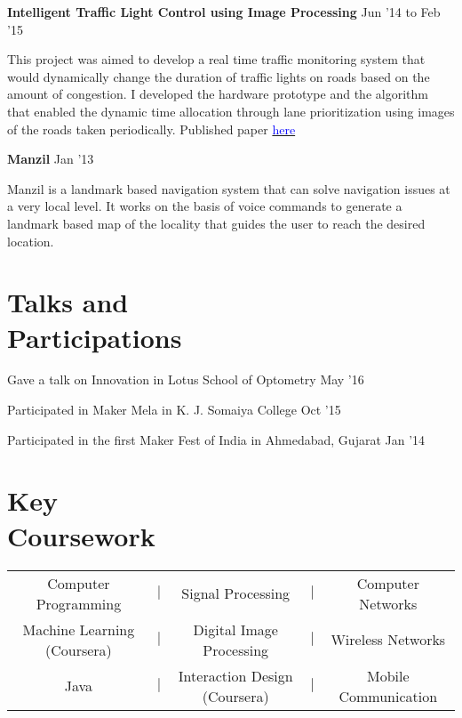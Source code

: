 \documentclass[margin,line]{res}
\newenvironment{list1}{
  \begin{list}{\ding{113}}{%
      \setlength{\itemsep}{0in}
      \setlength{\parsep}{0in} \setlength{\parskip}{0in}
      \setlength{\topsep}{0in} \setlength{\partopsep}{0in} 
      \setlength{\leftmargin}{0.17in}}}{\end{list}}
\begin{document}
\begin{resume}
\vspace*{-0.1in}

{\bf Intelligent Traffic Light Control using Image Processing} \hfill {Jun '14 to Feb '15} \\
\vspace*{-.15in}
\begin{list1}
\item[]This project was aimed to develop a real time traffic monitoring system that would dynamically change the duration of traffic lights on roads based on the amount of congestion. I developed the hardware prototype and the algorithm that enabled the dynamic time allocation through lane prioritization using images of the roads taken periodically.   
Published paper \href{http://iraj.in/up_proc/pdf/129-14265951081-3.pdf}{\textcolor{blue}{here}}
\end{list1}

\vspace*{-0.1in}

{\bf Manzil} \hfill {Jan '13} \\
\vspace*{-.15in}
\begin{list1}
\item[]
Manzil is a landmark based navigation system that can solve navigation issues at a very local level. It works on the basis of voice commands to generate a landmark based map of the locality that guides the user to reach the desired location. 
\end{list1}

\section{\sc Talks and \\ Participations}
{Gave a talk on Innovation in Lotus School of Optometry} \hfill {May '16}

\vspace*{-0.1in}

{Participated in Maker Mela in K. J. Somaiya College} \hfill {Oct '15}

\vspace*{-0.1in}

{Participated in the first Maker Fest of India in Ahmedabad, Gujarat} \hfill {Jan '14} 

\section{\sc Key \\Coursework} 
\begin{tabular}{ccccc}
Computer Programming & $|$ & Signal Processing & $|$ & Computer Networks \\
Machine Learning (Coursera) & $|$ & Digital Image Processing & $|$ & Wireless Networks \\
Java & $|$ & Interaction Design (Coursera) & $|$ & Mobile Communication
\end{tabular}


\end{resume}
\end{document}
